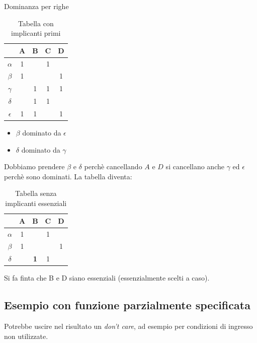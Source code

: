 \documentclass[a4paper]{article}
\theoremstyle{break}
\theoremstyle{break}
\theoremstyle{break}
\theoremstyle{break}
\begin{document}
\begin{example}
    Dominanza per righe
    \begin{table}[H]
        \begin{center}
            \begin{tabular}{c|c|c|c|c}
            & A & B & C & D\\
            \hline 
                \( \alpha \) & 1 &  & 1 &  \\ 
                \( \beta \) & 1 &  &  & 1 \\
                \( \gamma \) &  & 1 & 1 & 1 \\
                \( \delta \) &  & 1 & 1 &  \\
                \( \epsilon \) & 1 & 1 &  & 1 \\
            \end{tabular}
        \end{center}
        \caption{Tabella con implicanti primi}
    \end{table}
    \begin{itemize}
        \item \( \beta \) dominato da \( \epsilon \) 
            \item \( \delta \) dominato da \( \gamma \) 
    \end{itemize}
    Dobbiamo prendere \( \beta \) e \( \delta \) perchè cancellando \( A \) e \( D \)
    si cancellano anche \( \gamma \) ed \( \epsilon \) perchè sono dominati.  
    La tabella diventa:
    \begin{table}[H]
        \begin{center}
            \begin{tabular}{c|c|c|c|c}
            & A & B & C & D\\
            \hline 
                \( \alpha \) & 1 && 1 &  \\ 
                \( \beta \) & 1 & &  & 1  \\
                \( \delta \) &  & \textbf{1} & 1 & \\
            \end{tabular}
        \end{center}
        \caption{Tabella senza implicanti essenziali}
    \end{table}
    Si fa finta che B e D siano essenziali (essenzialmente scelti a caso).
\end{example}


\subsection{Esempio con funzione parzialmente specificata}
Potrebbe uscire nel risultato un \emph{don't care}, ad esempio per condizioni di 
ingresso non utilizzate.
\end{document}

